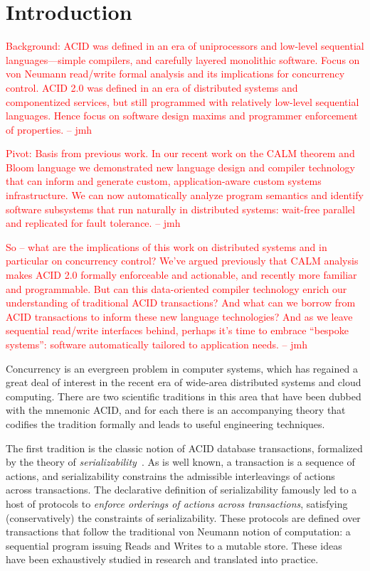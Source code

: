 \documentclass{sig-alternate}
\newcommand{\jmh}[1]{{\textcolor{red}{#1 -- jmh}}}
\begin{document}
\section{Introduction}
\jmh{Background: ACID was defined in an era of uniprocessors and low-level sequential languages---simple compilers, and carefully layered monolithic software.  Focus on von Neumann read/write formal analysis and its implications for concurrency control.  ACID 2.0 was defined in an era of distributed systems and componentized services, but still programmed with relatively low-level sequential languages.  Hence focus on software design maxims and programmer enforcement of properties.}

\jmh{Pivot: Basis from previous work.  In our recent work on the CALM theorem and Bloom language we demonstrated new language design and compiler technology that can inform and generate custom, application-aware custom systems infrastructure.  We can now automatically analyze program semantics and identify software subsystems that run naturally in distributed systems: wait-free parallel and replicated for fault tolerance.}

\jmh{So -- what are the implications of this work on distributed systems and in particular on concurrency control?  We've argued previously that CALM analysis makes ACID 2.0 formally enforceable and actionable, and recently more familiar and programmable.  But can this data-oriented compiler technology enrich our understanding of traditional ACID transactions?  And what can we borrow from ACID transactions to inform these new language technologies?  And as we leave sequential read/write interfaces behind, perhaps it's time to embrace ``bespoke systems'': software automatically tailored to application needs.}


Concurrency is an evergreen problem in computer systems, which has regained a
great deal of interest in the recent era of wide-area distributed systems and
cloud computing.  There are two scientific traditions in this area that have
been dubbed with the mnemonic \textsf{ACID}, and for each there is an
accompanying theory that codifies the tradition formally and leads to useful
engineering techniques.

The first tradition is the classic notion of \textsf{ACID} database
transactions, formalized by the theory of \emph{serializability}~\cite{Papadimitriou1979}.
As is well known, a transaction is a sequence of actions, and serializability
constrains the admissible interleavings of actions across transactions.  The
declarative definition of serializability famously led to a host of protocols to
\emph{enforce orderings of actions across transactions}, satisfying
(conservatively) the constraints of serializability.  These protocols are
defined over transactions that follow the traditional von Neumann notion of
computation: a sequential program issuing Reads and Writes to a mutable store.
These ideas have been exhaustively studied in research and translated into
practice.
\end{document}
